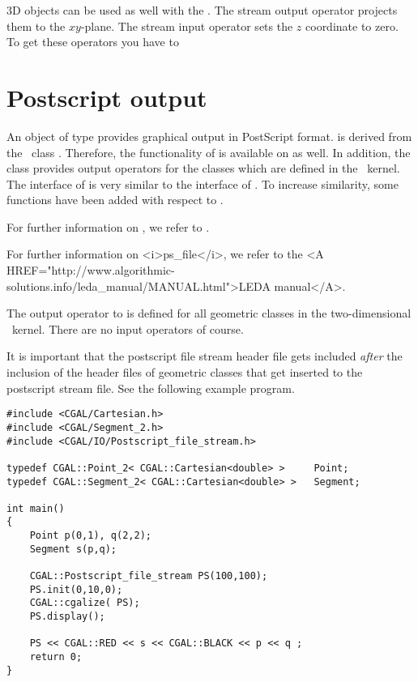 3D objects can be used as well with the . The stream output
operator \ccc{<<} projects them to the $xy$-plane. The stream input
operator \ccc{>>} sets the $z$ coordinate to zero.
To get these operators you have to 



\section{Postscript output}

An object of type  provides graphical output in PostScript
format.
 is derived from the \leda\ class .
Therefore, the functionality of  is available on 
as well.
In addition, the class  provides output 
operators for the classes which are defined in the \cgal\ kernel.
The interface of  is very similar to the interface 
of . 
To increase similarity, some functions have been added with respect to .
\begin{ccTexOnly}
For further information on , we refer to \cite{mnsu-lum}.
\end{ccTexOnly}
\begin{ccHtmlOnly}
For further information on <i>ps_file</i>, we refer to the 
<A HREF="http://www.algorithmic-solutions.info/leda_manual/MANUAL.html">LEDA manual</A>.
\end{ccHtmlOnly}

The output operator to  is defined for all geometric classes 
in the two-dimensional \cgal\ kernel. There are no input operators of course.

It is important that the postscript file stream header file gets included
{\em after} the inclusion of the header files of geometric classes
that get inserted to the postscript stream file. See the following example program.

\begin{verbatim}
#include <CGAL/Cartesian.h>
#include <CGAL/Segment_2.h>
#include <CGAL/IO/Postscript_file_stream.h>

typedef CGAL::Point_2< CGAL::Cartesian<double> >     Point;
typedef CGAL::Segment_2< CGAL::Cartesian<double> >   Segment;

int main()
{
    Point p(0,1), q(2,2);
    Segment s(p,q);

    CGAL::Postscript_file_stream PS(100,100);
    PS.init(0,10,0);
    CGAL::cgalize( PS);
    PS.display();

    PS << CGAL::RED << s << CGAL::BLACK << p << q ;
    return 0;
}
\end{verbatim} 

